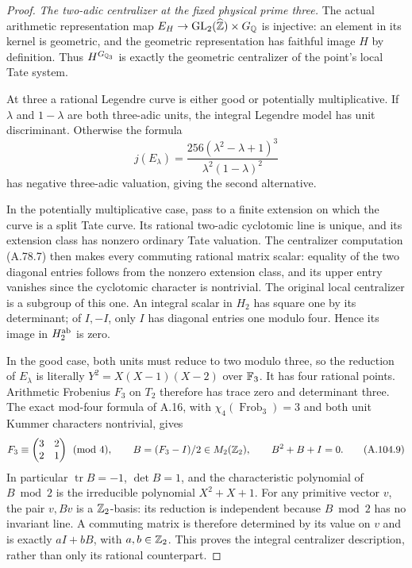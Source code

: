 \begin{proof}
\emph{The two-adic centralizer at the fixed physical prime three.}
The actual arithmetic representation map
$E_H\to\operatorname{GL}_2(\widehat{\mathbb Z})\times G_\mathbb Q$
is injective: an element in its kernel is
geometric, and the geometric representation
has faithful image $H$ by definition.
Thus $H^{G_{\mathbb Q_3}}$ is exactly the geometric
centralizer of the point's local Tate system.

At three a rational Legendre curve is either
good or potentially multiplicative.
If $\lambda$ and $1-\lambda$ are both
three-adic units, the integral Legendre
model has unit discriminant.  Otherwise
the formula
\[
             j(E_\lambda)=
              \frac{256(\lambda^2-\lambda+1)^3}
                   {\lambda^2(1-\lambda)^2}
\tag{A.104.8}
\]
has negative three-adic valuation, giving
the second alternative.

In the potentially multiplicative case,
pass to a finite extension on which the
curve is a split Tate curve.
Its rational two-adic cyclotomic line is
unique, and its extension class has
nonzero ordinary Tate valuation.
The centralizer computation (A.78.7)
then makes every commuting rational matrix
scalar: equality of the two diagonal
entries follows from the nonzero extension
class, and its upper entry vanishes since
the cyclotomic character is nontrivial.
The original local centralizer is a
subgroup of this one.
An integral scalar in $H_2$ has square
one by its determinant; of $I,-I$,
only $I$ has diagonal entries one modulo
four.  Hence its image in $H_2^{\rm ab}$
is zero.

In the good case, both units must reduce
to two modulo three, so the reduction of
$E_\lambda$ is literally
$Y^2=X(X-1)(X-2)$ over $\mathbb F_3$.
It has four rational points.
Arithmetic Frobenius $F_3$ on $T_2$ therefore
has trace zero and determinant three.
The exact mod-four formula of A.16, with
$\chi_4(\operatorname{Frob}_3)=3$ and
both unit Kummer characters nontrivial,
gives
\[
           F_3\equiv\begin{pmatrix}3&2\\2&1\end{pmatrix}
                 \pmod4,
       \qquad B=(F_3-I)/2\in M_2(\mathbb Z_2),
       \qquad B^2+B+I=0.
\tag{A.104.9}
\]
In particular $\operatorname{tr}B=-1$,
$\det B=1$, and the characteristic
polynomial of $B\bmod2$ is the irreducible
polynomial $X^2+X+1$.
For any primitive vector $v$, the pair
$v,Bv$ is a $\mathbb Z_2$-basis: its reduction
is independent because $B\bmod2$ has no
invariant line.  A commuting matrix is
therefore determined by its value on $v$
and is exactly $aI+bB$, with $a,b\in\mathbb Z_2$.
This proves the integral centralizer
description, rather than only its
rational counterpart.


\end{proof}

